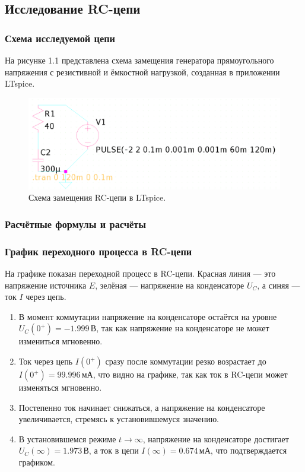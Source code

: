 \subsection{Исследование RC-цепи}

\subsubsection{Схема исследуемой цепи}
На рисунке 1.1 представлена схема замещения генератора прямоугольного напряжения с резистивной и ёмкостной нагрузкой, созданная в приложении LTspice.

\begin{figure}[H]
	\centering
	\includegraphics[width=1\textwidth]{./data/rc-schema.png}
	\caption{Схема замещения RC-цепи в LTspice.}
\end{figure}

\subsubsection{Расчётные формулы и расчёты}


\subsubsection{График переходного процесса в RC-цепи}
На графике показан переходной процесс в RC-цепи. Красная линия — это напряжение источника \( E \), зелёная — напряжение на конденсаторе \( U_C \), а синяя — ток \( I \) через цепь.

\begin{enumerate}[noitemsep,topsep=0pt,left=6pt,label=\arabic*.]
	\item В момент коммутации напряжение на конденсаторе остаётся на уровне \( U_C(0^+) = -1.999 \, \text{В} \), так как напряжение на конденсаторе не может измениться мгновенно.
	\item Ток через цепь \( I(0^+) \) сразу после коммутации резко возрастает до \( I(0^+) = 99.996 \, \text{мА} \), что видно на графике, так как ток в RC-цепи может изменяться мгновенно.
	\item Постепенно ток начинает снижаться, а напряжение на конденсаторе увеличивается, стремясь к установившемуся значению.
	\item В установившемся режиме \( t \to \infty \), напряжение на конденсаторе достигает \( U_C(\infty) = 1.973 \, \text{В} \), а ток в цепи \( I(\infty) = 0.674 \, \text{мА} \), что подтверждается графиком.
\end{enumerate}

